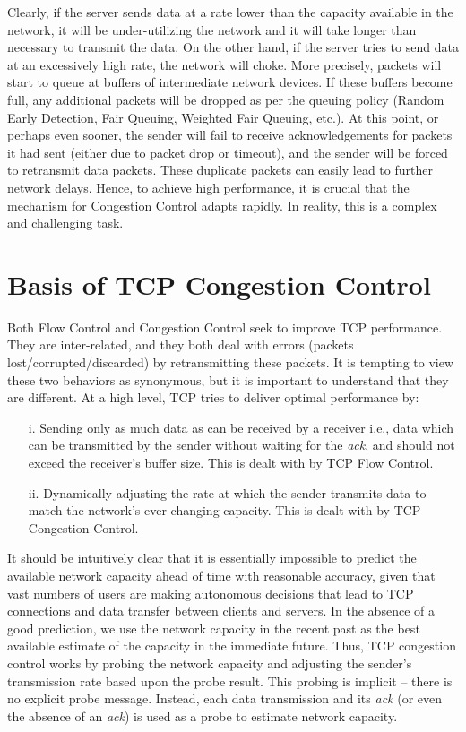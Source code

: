 \begin{multicols}{2}
Clearly, if the server sends data at a rate lower than the capacity available in the network, it will be under-utilizing the network and it will take longer than necessary to transmit the data. On the other hand, if the server tries to send data at an excessively high rate, the network will choke. More precisely, packets will start to queue at buffers of intermediate network devices. If these buffers become full, any additional packets will be dropped as per the queuing policy (Random Early Detection, Fair Queuing, Weighted Fair Queuing, etc.). At this point, or perhaps even sooner, the sender will fail to receive acknowledgements for packets it had sent (either due to packet drop or timeout), and the sender will be forced to retransmit data packets. These duplicate packets can easily lead to further network delays. Hence, to achieve high performance, it is crucial that the mechanism for Congestion Control adapts rapidly. In reality, this is a complex and challenging task.

\section*{Basis of TCP Congestion Control}

Both Flow Control and Congestion Control seek to improve TCP performance. They are inter-related, and they both deal with errors (packets lost/corrupted/discarded) by retransmitting these packets. It is tempting to view these two behaviors as synonymous, but it is important to understand that they are different. At a high level, TCP tries to deliver optimal performance by:
\begin{itemize}
\item[i.] Sending only as much data as can be received by a receiver i.e., data which can be transmitted by the sender without waiting for the \textit{ack}, and should not exceed the receiver’s buffer size. This is dealt with by TCP Flow Control.
\item[ii.]  Dynamically adjusting the rate at which the sender transmits data to match the network’s ever-changing capacity. This is dealt with by TCP Congestion Control.
\end{itemize}

It should be intuitively clear that it is essentially impossible to predict the available network capacity ahead of time with reasonable accuracy, given that vast numbers of users are making autonomous decisions that lead to TCP connections and data transfer between clients and servers. In the absence of a good prediction, we use the network capacity in the recent past as the best available estimate of the capacity in the immediate future. Thus, TCP congestion control works by probing the network capacity and adjusting the sender’s transmission rate based upon the probe result. This probing is implicit – there is no explicit probe message. Instead, each data transmission and its \textit{ack} (or even the absence of an \textit{ack}) is used as a probe to estimate network capacity.


\end{multicols}
